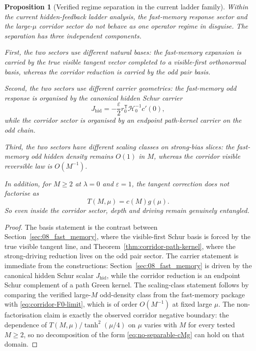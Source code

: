 \documentclass[11pt]{article}
\numberwithin{equation}{section}
\newcommand{\eps}{\varepsilon}
\theoremstyle{thmcompact}
\newtheorem{proposition}[theorem]{Proposition}
\theoremstyle{remark}
\begin{document}
\begin{proposition}[Verified regime separation in the current ladder family]\label{thm:regime-separation}
Within the current hidden-feedback ladder analysis, the fast-memory response sector and the large-$\mu$ corridor sector do not behave as one operator regime in disguise. The separation has three independent components.

First, the two sectors use different natural bases: the fast-memory expansion is carried by the true visible tangent vector completed to a visible-first orthonormal basis, whereas the corridor reduction is carried by the odd pair basis.

Second, the two sectors use different carrier geometries: the fast-memory odd response is organised by the canonical hidden Schur carrier
\[
J_{\mathrm{hid}}=-\frac{\eps}{2}r_0^{\mathsf T}\mathcal H_0^{-1}c'(0),
\]
while the corridor sector is organised by an endpoint path-kernel carrier on the odd chain.

Third, the two sectors have different scaling classes on strong-bias slices: the fast-memory odd hidden density remains $O(1)$ in $M$, whereas the corridor visible reversible law is $O(M^{-1})$.

In addition, for $M\ge 2$ at $\lambda=0$ and $\eps=1$, the tangent correction does not factorise as
\begin{equation}\label{eq:no-separable-cMg}
T(M,\mu)=c(M)g(\mu).
\end{equation}
So even inside the corridor sector, depth and driving remain genuinely entangled.
\end{proposition}

\begin{proof}
The basis statement is the contrast between Section~\ref{sec:08_fast_memory}, where the visible-first Schur basis is forced by the true visible tangent line, and Theorem~\ref{thm:corridor-path-kernel}, where the strong-driving reduction lives on the odd pair sector. The carrier statement is immediate from the constructions: Section~\ref{sec:08_fast_memory} is driven by the canonical hidden Schur scalar $J_{\mathrm{hid}}$, while the corridor reduction is an endpoint Schur complement of a path Green kernel. The scaling-class statement follows by comparing the verified large-$M$ odd-density class from the fast-memory package with \eqref{eq:corridor-F0-limit}, which is of order $O(M^{-1})$ at fixed large $\mu$. The non-factorisation claim is exactly the observed corridor negative boundary: the dependence of $T(M,\mu)/\tanh^2(\mu/4)$ on $\mu$ varies with $M$ for every tested $M\ge2$, so no decomposition of the form \eqref{eq:no-separable-cMg} can hold on that domain.
\end{proof}
\end{document}
